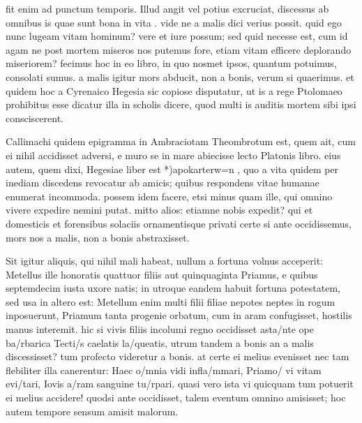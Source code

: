 fit enim ad punctum temporis. Illud angit vel potius excruciat, discessus ab omnibus is quae sunt bona in vita . vide ne a malis dici verius possit. quid ego nunc lugeam vitam hominum? vere et iure possum; sed quid necesse est, cum id agam ne post mortem miseros nos putemus fore, etiam vitam efficere deplorando miseriorem? fecimus hoc in eo libro, in quo nosmet ipsos, quantum potuimus, consolati sumus. a malis igitur mors abducit, non a bonis, verum si quaerimus. et quidem hoc a Cyrenaico Hegesia sic copiose disputatur, ut is a rege Ptolomaeo prohibitus esse dicatur illa in scholis dicere, quod multi is auditis mortem sibi ipsi consciscerent.

 Callimachi quidem epigramma in Ambraciotam Theombrotum est, quem ait, cum ei nihil accidisset adversi, e muro se in mare abiecisse lecto Platonis libro. eius autem, quem dixi, Hegesiae liber est *)apokarterw=n , quo a vita quidem per inediam discedens revocatur ab amicis; quibus respondens vitae humanae enumerat incommoda. possem idem facere, etsi minus quam ille, qui omnino vivere expedire nemini putat. mitto alios: etiamne nobis expedit? qui et domesticis et forensibus solaciis ornamentisque privati certe si ante occidissemus, mors nos a malis, non a bonis abstraxisset.

 Sit igitur aliquis, qui nihil mali habeat, nullum a fortuna volnus acceperit: Metellus ille honoratis quattuor filiis aut quinquaginta Priamus, e quibus septemdecim iusta uxore natis; in utroque eandem habuit fortuna potestatem, sed usa in altero est: Metellum enim multi filii filiae nepotes neptes in rogum inposuerunt, Priamum tanta progenie orbatum, cum in aram confugisset, hostilis manus interemit. hic si vivis filiis incolumi regno occidisset asta/nte ope ba/rbarica Tecti/s caelatis la/queatis, utrum tandem a bonis an a malis discessisset? tum profecto videretur a bonis. at certe ei melius evenisset nec tam flebiliter illa canerentur: Haec o/mnia vidi infla/mmari, Priamo/ vi vitam evi/tari, Iovis a/ram sanguine tu/rpari. quasi vero ista vi quicquam tum potuerit ei melius accidere! quodsi ante occidisset, talem eventum omnino amisisset; hoc autem tempore sensum amisit malorum.


